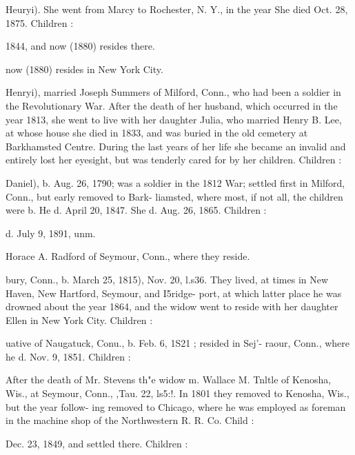 \documentclass[oneside]{book}
\begin{document}
Heuryi). She went from Marcy to Rochester, N. Y., in the year 
She died Oct. 28, 1875. Children : 


1844, and now (1880) resides there. 


now (1880) resides in New York City. 

Henryi), married Joseph Summers of Milford, Conn., who had 
been a soldier in the Revolutionary War. After the death of her 
husband, which occurred in the year 1813, she went to live with 
her daughter Julia, who married Henry B. Lee, at whose house she 
died in 1833, and was buried in the old cemetery at Barkhamsted 
Centre. During the last years of her life she became an invalid 
and entirely lost her eyesight, but was tenderly cared for by her 
children. Children : 




Daniel), b. Aug. 26, 1790; was a soldier in the 1812 War; 
settled first in Milford, Conn., but early removed to Bark- 
liamsted, where most, if not all, the children were b. He d. 
April 20, 1847. She d. Aug. 26, 1865. Children : 



d. July 9, 1891, unm. 




Horace A. Radford of Seymour, Conn., where they 
reside. 


bury, Conn., b. March 25, 1815), Nov. 20, l.s36. They lived, 
at times in New Haven, New Hartford, Seymour, and I5ridge- 
port, at which latter place he was drowned about the year 
1864, and the widow went to reside with her daughter Ellen 
in New York City. Children : 









uative of Naugatuck, Conu., b. Feb. 6, 1S21 ; resided in Sej'- 
raour, Conn., where he d. Nov. 9, 1851. Children : 




After the death of Mr. Stevens th"e widow m. Wallace M. 
Tnltle of Kenosha, Wis., at Seymour, Conn., ,Tau. 22, ls5:!. 
In 1801 they removed to Kenosha, Wis., but the year follow- 
ing removed to Chicago, where he was employed as foreman 
in the machine shop of the Northwestern R. R. Co. Child : 



Dec. 23, 1849, and settled there. Children : 
\end{document}
